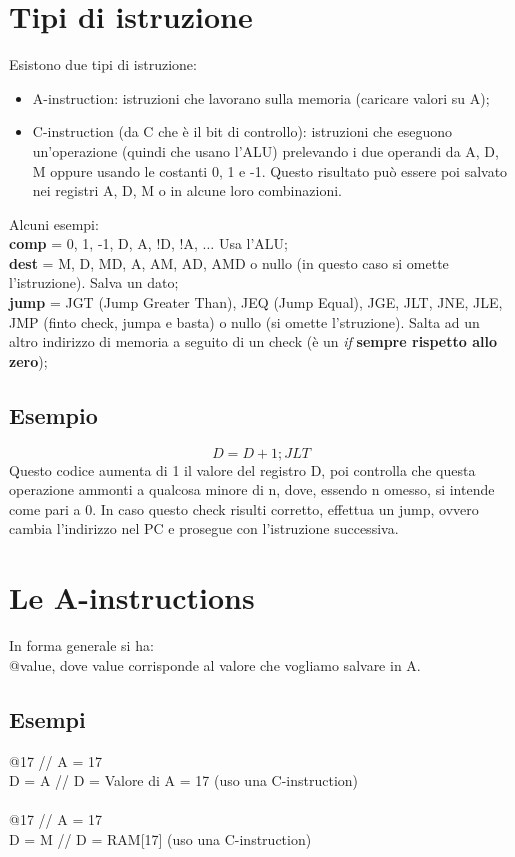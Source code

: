\documentclass[12pt]{article}
\begin{document}
\section{Tipi di istruzione}
Esistono due tipi di istruzione:
\begin{itemize}
    \item A-instruction: istruzioni che lavorano sulla memoria (caricare valori su A);
    \item C-instruction (da C che è il bit di controllo): istruzioni che eseguono un'operazione (quindi che usano l'ALU) prelevando i due operandi da A, D, M oppure usando le costanti 0, 1 e -1. Questo risultato può essere poi salvato nei registri A, D, M o in alcune loro combinazioni.
\end{itemize}
Alcuni esempi: \\
\textbf{comp} = 0, 1, -1, D, A, !D, !A, $\dots$ Usa l'ALU;\\
\textbf{dest} = M, D, MD, A, AM, AD, AMD o nullo (in questo caso si omette l'istruzione). Salva un dato; \\
\textbf{jump} = JGT (Jump Greater Than), JEQ (Jump Equal), JGE, JLT, JNE, JLE, JMP (finto check, jumpa e basta) o nullo (si omette l'struzione). Salta ad un altro indirizzo di memoria a seguito di un check (è un \textit{if} \textbf{sempre rispetto allo zero});
\subsection{Esempio}
\[D = D + 1; JLT\]
Questo codice aumenta di 1 il valore del registro D, poi controlla che questa operazione ammonti a qualcosa minore di n, dove, essendo n omesso, si intende come pari a 0. In caso questo check risulti corretto, effettua un jump, ovvero cambia l'indirizzo nel PC e prosegue con l'istruzione successiva.

\section{Le A-instructions}
In forma generale si ha: \\
@value, dove value corrisponde al valore che vogliamo salvare in A.
\pagebreak
\subsection{Esempi}
@17     // A = 17 \\
D = A   // D = Valore di A = 17 (uso una C-instruction) \\
\\
@17     // A = 17 \\
D = M   // D = RAM[17] (uso una C-instruction)
\end{document}
